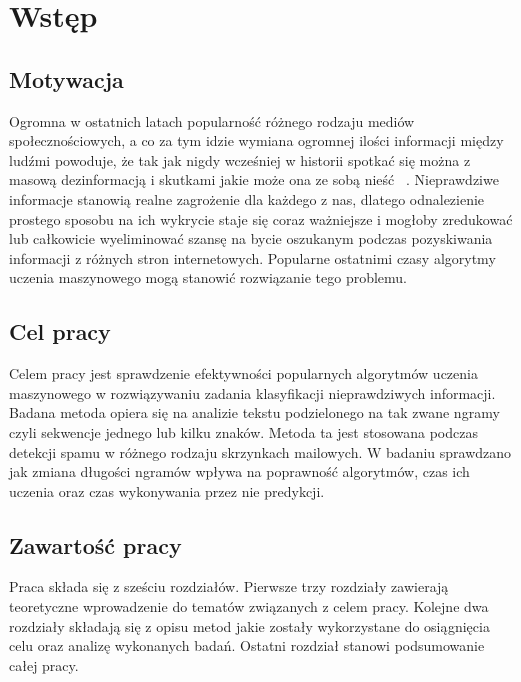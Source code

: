 \chapter*{Wstęp}
\section*{Motywacja}
Ogromna w ostatnich latach popularność różnego rodzaju mediów społecznościowych, a co za tym 
idzie wymiana ogromnej ilości informacji między ludźmi powoduje, że tak jak nigdy wcześniej 
w historii spotkać się można z masową dezinformacją i skutkami jakie może ona ze sobą nieść ~\cite{fakenewsreach}.
Nieprawdziwe informacje stanowią realne zagrożenie dla każdego z nas, dlatego odnalezienie 
prostego sposobu na ich wykrycie staje się coraz ważniejsze i mogłoby 
zredukować lub całkowicie wyeliminować szansę na bycie oszukanym podczas pozyskiwania
informacji z różnych stron internetowych. Popularne ostatnimi czasy algorytmy uczenia 
maszynowego mogą stanowić rozwiązanie tego problemu.
\section*{Cel pracy}
Celem pracy jest sprawdzenie efektywności popularnych algorytmów uczenia maszynowego w rozwiązywaniu 
zadania klasyfikacji nieprawdziwych informacji. Badana metoda opiera 
się na analizie tekstu podzielonego na tak zwane ngramy czyli sekwencje jednego lub kilku znaków.
Metoda ta jest stosowana podczas detekcji spamu w różnego rodzaju skrzynkach mailowych.
W badaniu sprawdzano jak zmiana długości ngramów wpływa na poprawność algorytmów, czas ich 
uczenia oraz czas wykonywania przez nie predykcji. 
\section*{Zawartość pracy}
Praca składa się z sześciu rozdziałów. Pierwsze trzy rozdziały zawierają teoretyczne wprowadzenie 
do tematów związanych z celem pracy. Kolejne dwa rozdziały składają się z opisu metod jakie 
zostały wykorzystane do osiągnięcia celu oraz analizę wykonanych badań. Ostatni rozdział 
stanowi podsumowanie całej pracy.

